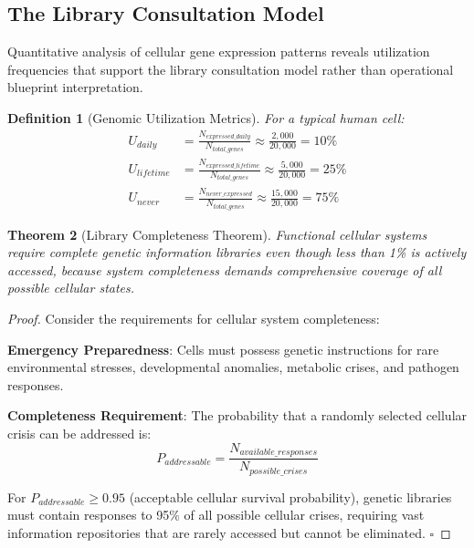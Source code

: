 \documentclass[12pt,a4paper]{article}
\newtheorem{theorem}{Theorem}[section]
\newtheorem{definition}[theorem]{Definition}
\begin{document}
\subsection{The Library Consultation Model}

Quantitative analysis of cellular gene expression patterns reveals utilization frequencies that support the library consultation model rather than operational blueprint interpretation.

\begin{definition}[Genomic Utilization Metrics]
For a typical human cell:
\begin{align}
U_{daily} &= \frac{N_{expressed\_daily}}{N_{total\_genes}} \approx \frac{2,000}{20,000} = 10\% \\
U_{lifetime} &= \frac{N_{expressed\_lifetime}}{N_{total\_genes}} \approx \frac{5,000}{20,000} = 25\% \\
U_{never} &= \frac{N_{never\_expressed}}{N_{total\_genes}} \approx \frac{15,000}{20,000} = 75\%
\end{align}
\end{definition}

\begin{theorem}[Library Completeness Theorem]
Functional cellular systems require complete genetic information libraries even though less than 1\% is actively accessed, because system completeness demands comprehensive coverage of all possible cellular states.
\end{theorem}

\begin{proof}
Consider the requirements for cellular system completeness:

\textbf{Emergency Preparedness}: Cells must possess genetic instructions for rare environmental stresses, developmental anomalies, metabolic crises, and pathogen responses.

\textbf{Completeness Requirement}: The probability that a randomly selected cellular crisis can be addressed is:
\begin{equation}
P_{addressable} = \frac{N_{available\_responses}}{N_{possible\_crises}}
\end{equation}

For $P_{addressable} \geq 0.95$ (acceptable cellular survival probability), genetic libraries must contain responses to 95\% of all possible cellular crises, requiring vast information repositories that are rarely accessed but cannot be eliminated. $\square$
\end{proof}
\end{document}
